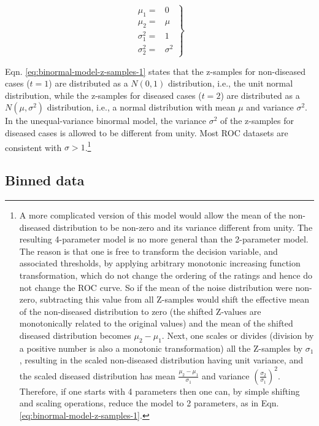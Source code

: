 \documentclass[
]{book}
\begin{document}
\begin{equation} 
\left.
\begin{aligned}
\mu_1=&0\\
\mu_2=&\mu\\
\sigma_{1}^{2}=&1\\
\sigma_{2}^{2}=&\sigma^{2}
\end{aligned}
\right \}
\label{eq:binormal-model-z-samples-2}
\end{equation}

Eqn. \eqref{eq:binormal-model-z-samples-1} states that the z-samples for non-diseased cases (\(t = 1\)) are distributed as a \(N(0,1)\) distribution, i.e., the unit normal distribution, while the z-samples for diseased cases (\(t = 2\)) are distributed as a \(N(\mu,\sigma^2)\) distribution, i.e., a normal distribution with mean \(\mu\) and variance \(\sigma^2\). In the unequal-variance binormal model, the variance \(\sigma^2\) of the z-samples for diseased cases is allowed to be different from unity. Most ROC datasets are consistent with \(\sigma > 1\).\footnote{A more complicated version of this model would allow the mean of the non-diseased distribution to be non-zero and its variance different from unity. The resulting 4-parameter model is no more general than the 2-parameter model. The reason is that one is free to transform the decision variable, and associated thresholds, by applying arbitrary monotonic increasing function transformation, which do not change the ordering of the ratings and hence do not change the ROC curve. So if the mean of the noise distribution were non-zero, subtracting this value from all Z-samples would shift the effective mean of the non-diseased distribution to zero (the shifted Z-values are monotonically related to the original values) and the mean of the shifted diseased distribution becomes \(\mu_2-\mu_1\). Next, one scales or divides (division by a positive number is also a monotonic transformation) all the Z-samples by \(\sigma_1\), resulting in the scaled non-diseased distribution having unit variance, and the scaled diseased distribution has mean \(\frac{\mu_2-\mu_1}{\sigma_1}\) and variance \((\frac{\sigma_2}{\sigma_1})^2\). Therefore, if one starts with 4 parameters then one can, by simple shifting and scaling operations, reduce the model to 2 parameters, as in Eqn. \eqref{eq:binormal-model-z-samples-1}.}

\hypertarget{binned-data}{%
\subsection{Binned data}\label{binned-data}}
\end{document}
